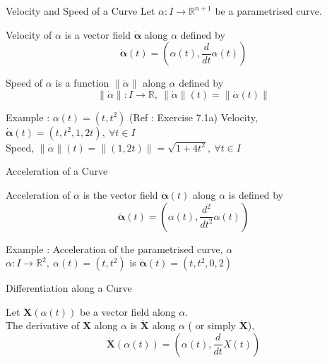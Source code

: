 \documentclass{beamer}
\begin{document}
\begin{frame}{Velocity and Speed of a Curve}
	Let $\alpha : I \to \mathbb{R}^{n+1}$ be a parametrised curve.
\begin{definition}[Velocity]
	Velocity of $\alpha$ is a { \color{teal} vector field $\dot{\boldsymbol{\alpha}}$ along $\alpha$} defined by $$\dot{\boldsymbol{\alpha}}(t) = \left(\alpha(t), \dfrac{d}{dt}\alpha(t)\right)$$
\end{definition}
\begin{definition}[Speed]
	Speed of $\alpha$ is a { \color{teal} function $\|\dot{\alpha}\|$ along $\alpha$} defined by $$\|\dot{\alpha}\| : I \to \mathbb{R},\ \|\dot{\alpha}\|(t) = \| \dot{\alpha}(t)\|$$
\end{definition}
	\begin{exampleblock}{Example : $\alpha(t) = (t,t^2)$ (Ref : Exercise 7.1a)} 
	Velocity, $\dot{\boldsymbol{\alpha}}(t) = (t,t^2,1,2t),\ \forall t \in I$\\
	Speed, $\|\dot{\alpha}\|(t) = \| (1,2t) \| = \sqrt{1+4t^2},\ \forall t \in I$
\end{exampleblock}
\end{frame}

\begin{frame}{Acceleration of a Curve}
\begin{definition}[Acceleration]
	Acceleration of $\alpha$ is { \color{teal}the vector field $\ddot{\boldsymbol{\alpha}}(t)$ along $\alpha$} is defined by $$\ddot{\boldsymbol{\alpha}}(t) = \left( \alpha(t), \dfrac{d^2}{dt^2} \alpha(t) \right) $$
\end{definition}
	Example : Acceleration of the parametrised curve, $\alpha$\\
	$\alpha : I \to \mathbb{R}^2,\ \alpha(t) = (t,t^2)$ is $\ddot{\boldsymbol{\alpha}}(t) = (t,t^2,0,2)$
\end{frame}

\begin{frame}{Differentiation along a Curve}
\begin{definition}
	Let $\mathbf{X}(\alpha(t))$ be a vector field along $\alpha$.\\
	The derivative of {\color{teal}$\mathbf{X}$ along $\alpha$} is {\color{magenta}$\dot{\mathbf{X}}$ along $\alpha$} ( or simply $\dot{\mathbf{X}}$),
	$$\dot{\mathbf{X}}(\alpha(t)) = \left( \alpha(t),\dfrac{d}{dt}X(t)\right)$$
\end{definition}
\end{frame}
\end{document}
